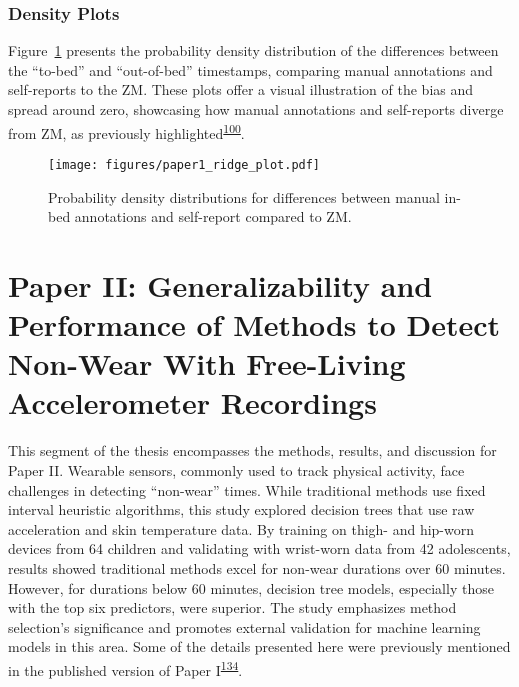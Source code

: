 \documentclass[
  10pt,
]{scrbook}
\begin{document}
\hypertarget{density-plots}{%
\subsection{Density Plots}\label{density-plots}}

Figure~\ref{fig-ridge_plot} presents the probability density
distribution of the differences between the ``to-bed'' and
``out-of-bed'' timestamps, comparing manual annotations and self-reports
to the ZM. These plots offer a visual illustration of the bias and
spread around zero, showcasing how manual annotations and self-reports
diverge from ZM, as previously
highlighted\textsuperscript{\protect\hyperlink{ref-van_hees_estimating_2018}{100}}.

\begin{figure}

{\centering \texttt{[image: figures/paper1\_ridge\_plot.pdf]}

}

\caption{\label{fig-ridge_plot}Probability density distributions for
differences between manual in-bed annotations and self-report compared
to ZM.}

\end{figure}

\newpage

\hypertarget{paper-ii-generalizability-and-performance-of-methods-to-detect-non-wear-with-free-living-accelerometer-recordings}{%
\chapter{Paper II: Generalizability and Performance of Methods to Detect
Non-Wear With Free-Living Accelerometer
Recordings}\label{paper-ii-generalizability-and-performance-of-methods-to-detect-non-wear-with-free-living-accelerometer-recordings}}

This segment of the thesis encompasses the methods, results, and
discussion for Paper II. Wearable sensors, commonly used to track
physical activity, face challenges in detecting ``non-wear'' times.
While traditional methods use fixed interval heuristic algorithms, this
study explored decision trees that use raw acceleration and skin
temperature data. By training on thigh- and hip-worn devices from 64
children and validating with wrist-worn data from 42 adolescents,
results showed traditional methods excel for non-wear durations over 60
minutes. However, for durations below 60 minutes, decision tree models,
especially those with the top six predictors, were superior. The study
emphasizes method selection's significance and promotes external
validation for machine learning models in this area. Some of the details
presented here were previously mentioned in the published version of
Paper
I\textsuperscript{\protect\hyperlink{ref-skovgaard_generalizability_2023}{134}}.
\end{document}
